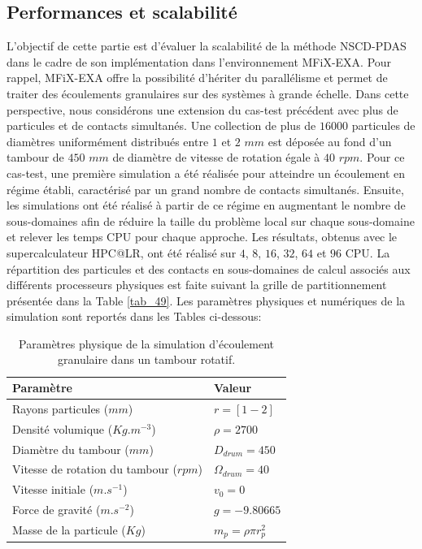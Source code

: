 \subsection{Performances et scalabilité}

L'objectif de cette partie est d'évaluer la scalabilité de la méthode NSCD-PDAS dans le cadre de son implémentation dans l'environnement MFiX-EXA. Pour rappel, MFiX-EXA offre la possibilité d'hériter du parallélisme et permet de traiter des écoulements granulaires sur des systèmes à grande échelle. Dans cette perspective, nous considérons une extension du cas-test précédent avec plus de particules et de contacts simultanés. Une collection de plus de $16000$ particules de diamètres uniformément distribués entre $1$ et $2$ $mm$ est déposée au fond d'un tambour de $450$ $mm$ de diamètre de vitesse de rotation égale à $40 $ $rpm$. Pour ce cas-test, une première simulation a été réalisée pour atteindre un écoulement en régime établi, caractérisé par un grand nombre de contacts simultanés. Ensuite, les simulations ont été réalisé à partir de ce régime en augmentant le nombre de sous-domaines afin de réduire la taille du problème local sur chaque sous-domaine et relever les temps CPU pour chaque approche. Les résultats, obtenus avec le supercalculateur HPC@LR, ont été réalisé sur $4$, $8$, $16$, $32$, $64$ et $96$ CPU. La répartition des particules et des contacts en sous-domaines de calcul associés aux différents processeurs physiques est faite suivant la grille de partitionnement présentée dans la Table \ref{tab_49}. Les paramètres physiques et numériques de la simulation sont reportés dans les Tables ci-dessous: 

\begin{center}
\begin{table}[!h]
\begin{tabular}{ |p{6.5cm}|p{6.1cm}| }
 \hline \rowcolor{lightgray}
 Paramètre& Valeur\\
 \hline
 Rayons particules  ($mm$) & $r = [1 - 2]$\\
 Densité volumique ($Kg.m^{-3}$)& $\rho = 2700$\\
 Diamètre du tambour ($mm$) & $D_{drum} = 450$\\
 Vitesse de rotation du tambour ($rpm$) & $\Omega_{drum} = 40$\\
 Vitesse initiale  ($m.s^{-1}$)  &$v_0 = 0$\\
 Force de gravité ($m.s^{-2}$)& $g = -9.80665$\\
 Masse de la particule ($Kg$)  &$m_p = \rho \pi r_p^{2}$\\
 \hline
\end{tabular}
\caption{Paramètres physique de la simulation d'écoulement granulaire dans un tambour rotatif.}\label{tab_47}
\end{table}
\end{center}

